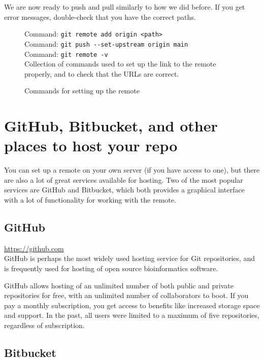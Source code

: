 \documentclass[../main/git_course_main.tex]{subfiles}
\begin{document}
	We are now ready to push and pull similarly to how we did before.
	If you get error messages, double-check that you have the correct paths.
	
	\begin{figure}[h!]
		\begin{bluebox}
			Command: \verb$git remote add origin <path>$ \\
			Command: \verb$git push --set-upstream origin main$ \\
			Command: \verb$git remote -v$ \\
			
			Collection of commands used to set up the link to the remote properly,
			and to check that the URLs are correct.
		\end{bluebox}
		\label{command:pull}
		\caption{Commands for setting up the remote}
	\end{figure}
	
	\section{GitHub, Bitbucket, and other places to host your repo}
	
	You can set up a remote on your own server (if you have access to one), but there are also
	a lot of great services available for hosting. Two of the most popular services are GitHub and Bitbucket, which both provides a graphical interface with a lot of functionality for working with the remote.
	
	\subsection{GitHub}
	
	\url{https://github.com} \\
	
	GitHub is perhaps the most widely used hosting service for Git repositories, and is frequently used for hosting of open source bioinformatics software. 
	
	GitHub allows hosting of an unlimited number of both public and private repositories for free, with an unlimited number of collaborators to boot. If you pay a monthly subscription, you get access to benefits like increased storage space and support. In the past, all users were limited to a maximum of five repositories, regardless of subscription.
	
	\subsection{Bitbucket}
	
\end{document}
